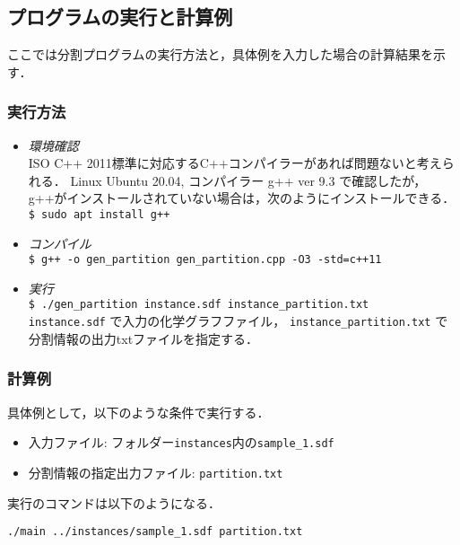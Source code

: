 \documentclass[11pt,titlepage,dvipdfmx,twoside]{jarticle}
\begin{document}

\subsection{プログラムの実行と計算例}
\label{sec:Example_p}

ここでは分割プログラムの実行方法と，具体例を入力した場合の計算結果を示す．

\subsubsection{実行方法}
\label{sec:compile_p}
\begin{itemize}
	\item {\em 環境確認}\\
		ISO C++ 2011標準に対応するC++コンパイラーがあれば問題ないと考えられる．
		Linux Ubuntu 20.04, コンパイラー g++ ver 9.3 で確認したが，g++がインストールされていない場合は，次のようにインストールできる．\\
		\verb|$ sudo apt install g++|
	\item {\em コンパイル}\\
		\verb|$ g++ -o gen_partition gen_partition.cpp -O3 -std=c++11|
	\item {\em 実行}\\
		\verb|$ ./gen_partition instance.sdf instance_partition.txt|\\
		\verb|instance.sdf| で入力の化学グラフファイル，
	  \verb|instance_partition.txt| で分割情報の出力txtファイルを指定する．
\end{itemize}


\subsubsection{計算例}
\label{sec:instance_p}

具体例として，以下のような条件で実行する．

\begin{itemize}
\item 入力ファイル: フォルダー{\tt instances}内の{\tt sample\_1.sdf}
\item 分割情報の指定出力ファイル: {\tt partition.txt}
\end{itemize}

実行のコマンドは以下のようになる．

\bigskip

{\tt ./main ../instances/sample\_1.sdf partition.txt}

\bigskip
\end{document}
